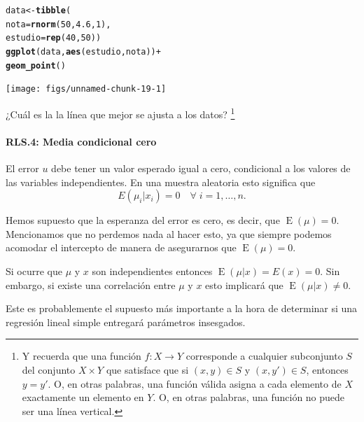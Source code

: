 \documentclass[12pt]{report}\usepackage[]{graphicx}\usepackage[]{color}
\makeatletter
\newcommand{\hlnum}[1]{\textcolor[rgb]{0.686,0.059,0.569}{#1}}%
\newcommand{\hlopt}[1]{\textcolor[rgb]{0,0,0}{#1}}%
\newcommand{\hlstd}[1]{\textcolor[rgb]{0.345,0.345,0.345}{#1}}%
\newcommand{\hlkwb}[1]{\textcolor[rgb]{0.69,0.353,0.396}{#1}}%
\newcommand{\hlkwc}[1]{\textcolor[rgb]{0.333,0.667,0.333}{#1}}%
\newcommand{\hlkwd}[1]{\textcolor[rgb]{0.737,0.353,0.396}{\textbf{#1}}}%
\newenvironment{kframe}{%
 \def\at@end@of@kframe{}%
 \ifinner\ifhmode%
  \def\at@end@of@kframe{\end{minipage}}%
  \begin{minipage}{\columnwidth}%
 \fi\fi%
 \def\FrameCommand##1{\hskip\@totalleftmargin \hskip-\fboxsep
 \colorbox{shadecolor}{##1}\hskip-\fboxsep
     \hskip-\linewidth \hskip-\@totalleftmargin \hskip\columnwidth}%
 \MakeFramed {\advance\hsize-\width
   \@totalleftmargin\z@ \linewidth\hsize
   \@setminipage}}%
 {\par\unskip\endMakeFramed%
 \at@end@of@kframe}
\newenvironment{knitrout}{}{} %
\newcommand{\E}{\operatorname{E}}
\makeatother
\begin{document}
\begin{knitrout}
\color{fgcolor}\begin{kframe}
\begin{alltt}
\hlstd{data} \hlkwb{<-} \hlkwd{tibble}\hlstd{(}
  \hlkwc{nota} \hlstd{=} \hlkwd{rnorm}\hlstd{(}\hlnum{50}\hlstd{,} \hlnum{4.6}\hlstd{,} \hlnum{1}\hlstd{),}
  \hlkwc{estudio} \hlstd{=} \hlkwd{rep}\hlstd{(}\hlnum{40}\hlstd{,} \hlnum{50}\hlstd{))}
\hlkwd{ggplot}\hlstd{(data,} \hlkwd{aes}\hlstd{(estudio, nota))} \hlopt{+}
  \hlkwd{geom_point}\hlstd{()}
\end{alltt}
\end{kframe}

{\centering \texttt{[image: figs/unnamed-chunk-19-1]} 

}



\end{knitrout}

¿Cuál es la la línea que mejor se ajusta a los datos? \footnote{Y recuerda que una función $f: X\to Y$ corresponde a cualquier subconjunto $S$ del conjunto $X\times Y$ que satisface que si $(x,y)\in S$ y $(x,y')\in S$, entonces $y = y'$. O, en otras palabras, una función válida asigna a cada elemento de $X$ exactamente un elemento en $Y$. O, en otras palabras, una función no puede ser una línea vertical.}

\paragraph{RLS.4: Media condicional cero}
El error $u$ debe tener un valor esperado igual a cero, condicional a los valores de las variables independientes. En una muestra aleatoria esto significa que
\begin{equation}
E(\mu_i | x_i) = 0 \quad \forall\; i = 1,\ldots, n.
\end{equation}

Hemos supuesto que la esperanza del error es cero, es decir, que $\E(\mu)=0$.
Mencionamos que no perdemos nada al hacer esto, ya que siempre podemos acomodar el intercepto de manera de asegurarnos que $\E(\mu)=0$.

Si ocurre que $\mu$ y $x$ son independientes entonces $\E(\mu | x) = E(x) = 0$.
Sin embargo, si existe una correlación entre $\mu$ y $x$ esto implicará que $\E(\mu | x) \neq 0$.

Este es probablemente el supuesto más importante a la hora de determinar si una regresión lineal simple entregará parámetros insesgados.
\end{document}
